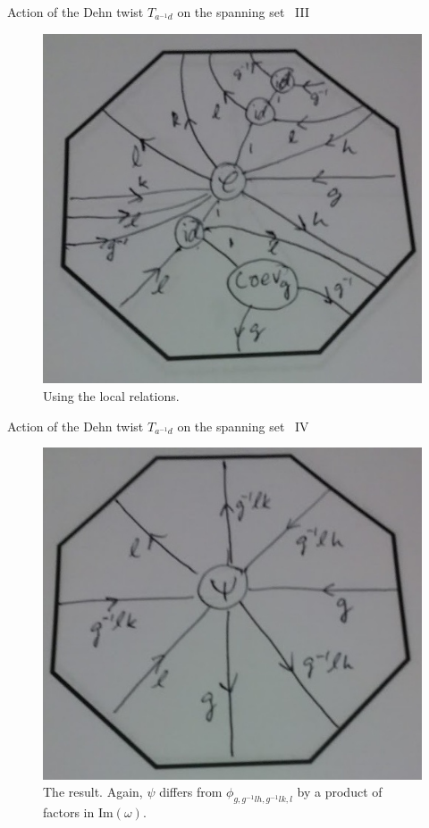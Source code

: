 \documentclass{beamer}
\renewcommand{\Im}{\mathrm{Im}}
\begin{document}
\begin{frame}{Action of the Dehn twist $T_{a^{-1}d}$ on the spanning set \, III}
\begin{figure}[h]
\centering
\includegraphics[height=0.7\textheight]{8.jpeg}
\caption{Using the local relations.}
\end{figure}
\end{frame}


\begin{frame}{Action of the Dehn twist $T_{a^{-1}d}$ on the spanning set \, IV}
\begin{figure}[h]
\centering
\includegraphics[height=0.7\textheight]{9.jpeg}
\caption{The result. Again, $\psi$ differs from $\phi_{g,g^{-1}lh,g^{-1}lk,l}$ by a product of factors in $\Im(\omega)$.}
\end{figure}
\end{frame}
\end{document}
